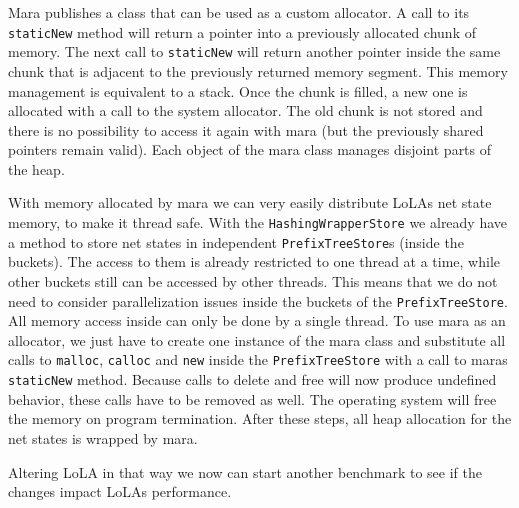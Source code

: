 Mara publishes a class that can be used as a custom allocator. A call to its \texttt{staticNew} method will return a pointer into a previously allocated chunk of memory. The next call to \texttt{staticNew} will return another pointer inside the same chunk that is adjacent to the previously returned memory segment. This memory management is equivalent to a stack. Once the chunk is filled, a new one is allocated with a call to the system allocator. The old chunk is not stored and there is no possibility to access it again with mara (but the previously shared pointers remain valid). Each object of the mara class manages disjoint parts of the heap.

With memory allocated by mara we can very easily distribute LoLAs net state memory, to make it thread safe. With the \texttt{Hashing\-Wrapper\-Store} we already have a method to store net states in independent \texttt{PrefixTreeStore}s (inside the buckets). The access to them is already restricted to one thread at a time, while other buckets still can be accessed by other threads. This means that we do not need to consider parallelization issues inside the buckets of the \texttt{PrefixTreeStore}. All memory access inside can only be done by a single thread. To use mara as an allocator, we just have to create one instance of the mara class and substitute all calls to \texttt{malloc}, \texttt{calloc} and \texttt{new} inside the \texttt{PrefixTreeStore} with a call to maras \texttt{staticNew} method. Because calls to delete and free will now produce undefined behavior, these calls have to be removed as well. The operating system will free the memory on program termination. After these steps, all heap allocation for the net states is wrapped by mara. 

Altering LoLA in that way we now can start another benchmark to see if the changes impact LoLAs performance. 

